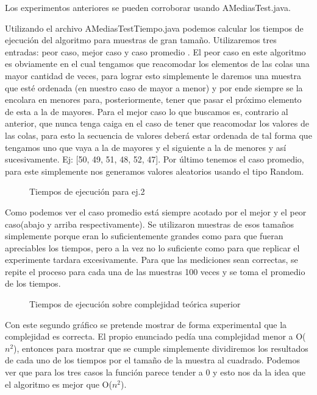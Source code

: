 Los experimentos anteriores se pueden corroborar usando AMediasTest.java.


Utilizando el archivo AMediasTestTiempo.java podemos calcular los tiempos de ejecución del algoritmo para muestras de gran tamaño. Utilizaremos tres entradas: peor caso, mejor caso y caso promedio
. El peor caso en este algoritmo es obviamente en el cual tengamos que reacomodar los elementos de las colas una mayor cantidad de veces, para lograr esto simplemente le 
daremos una muestra que esté ordenada (en nuestro caso de mayor a menor) y por ende siempre se la encolara en menores para, posteriormente, tener que pasar el próximo elemento
de esta a la de mayores. Para el mejor caso lo que buscamos es, contrario al anterior, que nunca tenga caiga en el caso de tener que reacomodar los valores de las colas, 
para esto la secuencia de valores deberá estar ordenada de tal forma que tengamos uno que vaya a la de mayores y el siguiente a la de menores y así sucesivamente. 
Ej: [50, 49, 51, 48, 52, 47]. Por último tenemos el caso promedio, para este simplemente nos generamos valores aleatorios usando el tipo Random.


\begin{figure}[H]
  \centering
  
  \caption{Tiempos de ejecución para ej.2}
\end{figure}


Como podemos ver el caso promedio está siempre acotado por el mejor y el peor caso(abajo y arriba respectivamente).
Se utilizaron muestras de esos tamaños simplemente porque eran lo suficientemente grandes como para que fueran apreciables los tiempos, pero a la vez no lo suficiente como para que replicar el experimente tardara excesivamente.
Para que las mediciones sean correctas, se repite el proceso para cada una de las muestras 100 veces y se toma el promedio de los tiempos. 

\begin{figure}[H]
  \centering
    
  \caption{Tiempos de ejecución sobre complejidad teórica superior}
\end{figure}

Con este segundo gráfico se pretende mostrar de forma experimental que la complejidad es correcta. El propio enunciado pedía una complejidad menor a O($n^2$), entonces
para mostrar que se cumple simplemente dividiremos los resultados de cada uno de los tiempos por el tamaño de la muestra al cuadrado. Podemos ver que para los tres casos
la función parece tender a 0 y esto nos da la idea que el algoritmo es mejor que O($n^2$).

